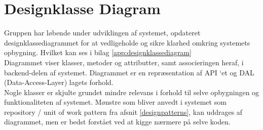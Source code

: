 \section{Designklasse Diagram}\label{Designklassediagram}
Gruppen har løbende under udviklingen af systemet, opdateret designklassediagrammet for at vedligeholde 
og sikre klarhed omkring systemets opbygning. Hvilket kan ses i bilag \ref{app:designklassediagram}\\

Diagrammet viser klasser, metoder og attributter, samt associeringen heraf, i backend-delen af systemet. 
Diagrammet er en repræsentation af API ‘et og DAL (Data-Access-Layer) lagets forhold.\\

Nogle klasser er skjulte grundet mindre relevans i forhold til selve opbygningen og funktionaliteten af systemet. 
Mønstre som bliver anvedt i systemet som repository / unit of work pattern fra afsnit \ref{designpatterns}, 
kan uddrages af diagrammet, men er bedst forstået ved at kigge nærmere på selve koden.
